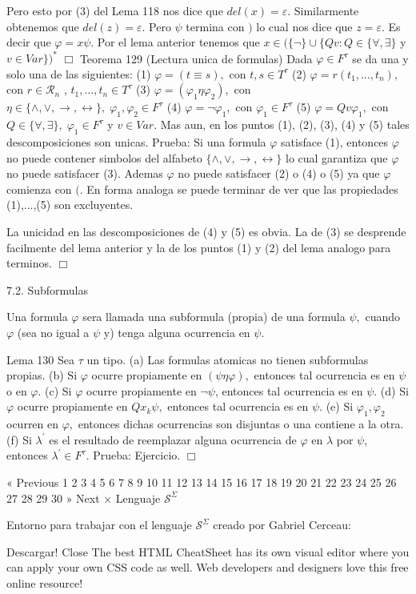 Pero esto por (3) del Lema 118 nos dice que \( del(x)=\varepsilon \). Similarmente obtenemos que \(del(z)=\varepsilon \). Pero \(\psi \) termina con \()\) lo cual nos dice que \(z=\varepsilon \). Es decir que \( \varphi =x\psi \). Por el lema anterior tenemos que \(x\in (\{\lnot \}\cup \{Qv:Q\in \{\forall ,\exists \}\) y \(v\in Var\})^{\ast }\) \(\Box\)
Teorema 129 (Lectura unica de formulas) Dada \(\varphi \in F^{\tau }\) se da una y solo una de las siguientes:
(1) \(\varphi =(t\equiv s),\) con \(t,s\in T^{\tau }\)
(2) \(\varphi =r(t_{1},...,t_{n}),\) con \(r\in \mathcal{R}_{n}\) , \(t_{1},...,t_{n}\in T^{\tau }\)
(3) \(\varphi =(\varphi _{1}\eta \varphi _{2}),\) con \(\eta \in \{\wedge ,\vee ,\rightarrow ,\leftrightarrow \},\;\varphi _{1},\varphi _{2}\in F^{\tau }\)
(4) \(\varphi =\lnot \varphi _{1},\) con \(\varphi _{1}\in F^{\tau }\)
(5) \(\varphi =Qv\varphi _{1},\) con \(Q\in \{\forall ,\exists \},\;\varphi _{1}\in F^{\tau }\) y \(v\in Var.\)
Mas aun, en los puntos (1), (2), (3), (4) y (5) tales descomposiciones son unicas.
Prueba: Si una formula \(\varphi \) satisface (1), entonces \(\varphi \) no puede contener simbolos del alfabeto \(\{\wedge ,\vee ,\rightarrow ,\leftrightarrow \}\) lo cual garantiza que \(\varphi \) no puede satisfacer (3). Ademas \( \varphi \) no puede satisfacer (2) o (4) o (5) ya que \(\varphi \) comienza con \((\). En forma analoga se puede terminar de ver que las propiedades (1),...,(5) son excluyentes.

La unicidad en las descomposiciones de (4) y (5) es obvia. La de (3) se desprende facilmente del lema anterior y la de los puntos (1) y (2) del lema analogo para terminos. \(\Box\)

7.2. Subformulas

Una formula \(\varphi \) sera llamada una subformula (propia) de una formula \(\psi ,\) cuando \(\varphi \) (sea no igual a \(\psi \) y) tenga alguna ocurrencia en \(\psi .\)

Lema 130 Sea \(\tau \) un tipo.
(a) Las formulas atomicas no tienen subformulas propias.
(b) Si \(\varphi \) ocurre propiamente en \((\psi \eta \varphi ),\) entonces tal ocurrencia es en \(\psi \) o en \(\varphi .\)
(c) Si \(\varphi \) ocurre propiamente en \(\lnot \psi \), entonces tal ocurrencia es en \(\psi .\)
(d) Si \(\varphi \) ocurre propiamente en \(Qx_{k}\psi ,\) entonces tal ocurrencia es en \(\psi .\)
(e) Si \(\varphi _{1},\varphi _{2}\) ocurren en \(\varphi ,\) entonces dichas ocurrencias son disjuntas o una contiene a la otra.
(f) Si \(\lambda ^{\prime }\) es el resultado de reemplazar alguna ocurrencia de \(\varphi \) en \(\lambda \) por \(\psi \), entonces \(\lambda ^{\prime }\in F^{\tau }\).
Prueba: Ejercicio. \(\Box\)

« Previous
1
2
3
4
5
6
7
8
9
10
11
12
13
14
15
16
17
18
19
20
21
22
23
24
25
26
27
28
29
30
» Next
×
Lenguaje \(\mathcal{S}^{\Sigma }\)

Entorno para trabajar con el lenguaje \(\mathcal{S}^{\Sigma }\) creado por Gabriel Cerceau:

Descargar!
Close
The best HTML CheatSheet has its own visual editor where you can apply your own CSS code as well. Web developers and designers love this free online resource!
